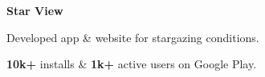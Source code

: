 \textbf{Star View} \hfill {}

	\begin{items}
		\item Developed app \& website for stargazing conditions.
		\item \textbf{10k+} installs \& \textbf{1k+} active users on Google Play.
	\end{items}